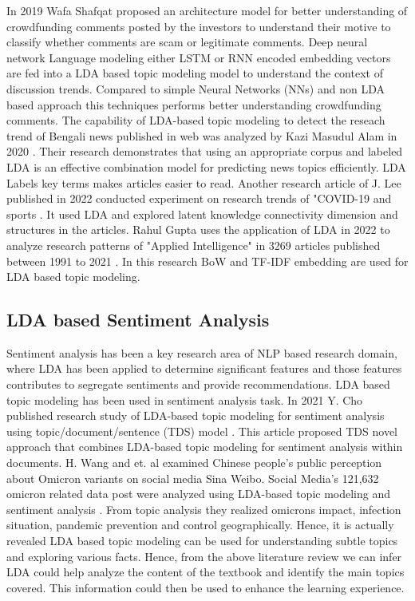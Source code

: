 \documentclass[sn-mathphys,Numbered]{sn-jnl}%
\theoremstyle{thmstyleone}%
\theoremstyle{thmstyletwo}%
\theoremstyle{thmstylethree}%
\begin{document}
In 2019 Wafa Shafqat \cite{shafqat2019topic} proposed an architecture model for better understanding of crowdfunding comments posted by the investors to understand their motive to classify whether comments are scam or legitimate comments. Deep neural network Language modeling either LSTM or RNN encoded embedding vectors are fed into a LDA based topic modeling model to understand the context of discussion trends. Compared to simple Neural Networks (NNs) and non LDA based approach this techniques performs better understanding crowdfunding comments. The capability of LDA-based topic modeling to detect the reseach trend of Bengali news published in web was analyzed by Kazi Masudul Alam in 2020 \cite{alam_bangla_2020}. Their research demonstrates that using an appropriate corpus and labeled LDA is an effective combination model for predicting news topics efficiently. LDA Labels key terms makes articles easier to read. Another research article of J. Lee published in 2022 conducted experiment on research trends of "COVID-19 and sports \cite{lee_lda_based_2022}. It used LDA and explored latent knowledge connectivity dimension and structures in the articles. Rahul Gupta  uses the application of LDA in 2022 to analyze research patterns of "Applied Intelligence" in 3269 articles published between 1991 to 2021 \cite{gupta_prediction_2022}. In this research BoW and TF-IDF embedding are used for LDA based topic modeling.

\subsection{LDA based Sentiment Analysis}\label{sent_lda}

Sentiment analysis has been a key research area of NLP based research domain, where LDA has been applied to determine significant features and those features contributes to segregate sentiments and provide recommendations. LDA based topic modeling has been used in sentiment analysis task. In 2021 Y. Cho published research study of LDA-based topic modeling for sentiment analysis using topic/document/sentence (TDS) model \cite{farkhod_lda_based_2021}. This article proposed TDS novel approach that combines LDA-based topic modeling for sentiment analysis within documents. H. Wang and et. al examined Chinese people's public perception about Omicron variants on social media Sina Weibo. Social Media's 121,632 omicron related data post were analyzed using LDA-based topic modeling and sentiment analysis \cite{wang_exploring_2022}. From topic analysis they realized omicron\textquotesingle s impact, infection situation, pandemic prevention and control geographically. Hence, it is actually revealed LDA based topic modeling can be used for understanding subtle topics and exploring various facts. Hence, from the above literature review we can infer LDA could help analyze the content of the textbook and identify the main topics covered. This information could then be used to enhance the learning experience.
\end{document}
